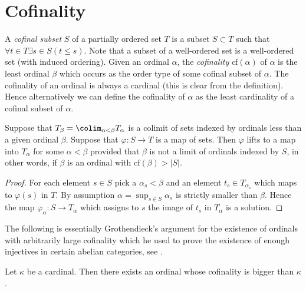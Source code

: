 \section{Cofinality}
\label{section-cofinality}

\noindent
A {\it cofinal subset} $S$ of a partially ordered set $T$ is a subset
$S \subset T$ such that $\forall t \in T \exists s\in S (t \leq s)$.
Note that a subset of a well-ordered set is a well-ordered set
(with induced ordering). Given an ordinal $\alpha$, the {\it cofinality}
$\text{cf}(\alpha)$ of $\alpha$ is the least ordinal $\beta$
which occurs as the order type of some cofinal subset of $\alpha$.
The cofinality of an ordinal is always a cardinal (this is clear from
the definition). Hence alternatively we can define the cofinality of
$\alpha$ as the least cardinality of a cofinal subset of $\alpha$.

\begin{lemma}
\label{lemma-map-from-set-lifts}
Suppose that $T_\beta = \colim_{\alpha < \beta} T_\alpha$
is a colimit of sets indexed by ordinals less than a given ordinal $\beta$.
Suppose that $\varphi : S \to T$ is a map of sets.
Then $\varphi$ lifts to a map into $T_\alpha$ for some $\alpha < \beta$
provided that $\beta$ is not a limit of ordinals indexed by $S$,
in other words, if $\beta$ is an ordinal with $\text{cf}(\beta) > |S|$.
\end{lemma}

\begin{proof}
For each element $s \in S$ pick a $\alpha_s < \beta$ and an element
$t_s \in T_{\alpha_s}$ which maps to $\varphi(s)$ in $T$.
By assumption $\alpha = \sup_{s \in S} \alpha_s$ is strictly smaller
than $\beta$. Hence the map $\varphi_\alpha : S \to T_\alpha$
which assigns to $s$ the image of $t_s$ in $T_\alpha$ is a solution.
\end{proof}

\noindent
The following is essentially Grothendieck's argument for the existence
of ordinals with arbitrarily large cofinality which he used to prove
the existence of enough injectives in certain abelian categories, see
\cite{Tohoku}.

\begin{proposition}
\label{proposition-exist-ordinals-large-cofinality}
Let $\kappa$ be a cardinal. Then there exists an ordinal
whose cofinality is bigger than $\kappa$.
\end{proposition}


